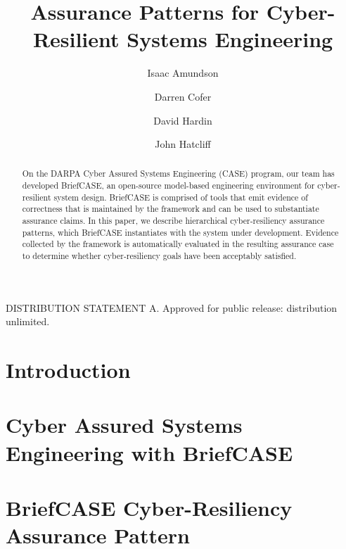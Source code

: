 \documentclass[runningheads]{llncs}
\begin{document}
\title{Assurance Patterns for Cyber-Resilient Systems Engineering}

\author{
	Isaac Amundson 
	\and Darren Cofer 
	\and David Hardin 
	\and John Hatcliff}



\maketitle

\begin{abstract}

On the DARPA Cyber Assured Systems Engineering (CASE) program, our team has developed BriefCASE, an open-source model-based engineering environment for cyber-resilient system design.  BriefCASE is comprised of tools that emit evidence of correctness that is maintained by the framework and can be used to substantiate assurance claims.  
In this paper, we describe hierarchical cyber-resiliency assurance patterns, which BriefCASE instantiates with the system under development. Evidence collected by the framework is automatically evaluated in the resulting assurance case to determine whether cyber-resiliency goals have been acceptably satisfied.

\end{abstract}

DISTRIBUTION STATEMENT A. Approved for public release: distribution unlimited.

\section{Introduction}
\label{sec:introduction}


\section{Cyber Assured Systems Engineering with BriefCASE}
\label{sec:briefcase}


\section{BriefCASE Cyber-Resiliency Assurance Pattern}
\label{sec:assurance-pattern}

\end{document}
